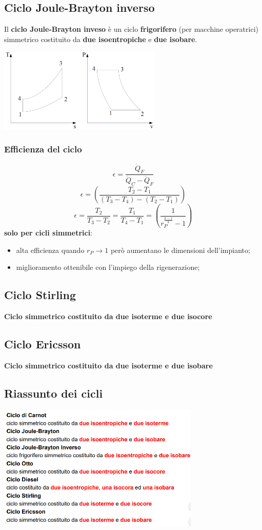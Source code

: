 \subsection{Ciclo Joule-Brayton inverso}
Il \textbf{ciclo Joule-Brayton inveso} è un ciclo \textbf{frigorifero} (per macchine operatrici) simmetrico costituito da \textbf{due isoentropiche} e \textbf{due isobare}.
\begin{center}
    \includegraphics[height=4cm]{../L07/img14.PNG}
\end{center}
\subsubsection{Efficienza del ciclo}
\[
    \epsilon = \frac{\dot{Q}_F}{\dot{Q}_C -\dot{Q}_F}
\]
\[
    \epsilon = \left(\frac{T_2-T_1}{(T_3-T_4) - (T_2-T_1)}\right)
\]
\[
    \epsilon = \frac{T_2}{T_3-T_2} = \frac{T_1}{T_4-T_1} = \left(  \frac{1}{r_P^{\frac{k-1}{k}}-1}  \right)
\]
\textbf{solo per cicli simmetrici}:
\begin{itemize}
    \item alta efficienza quando $r_P \rightarrow 1$ però aumentano le dimensioni dell'impianto;
    \item miglioramento ottenibile con l'impiego della rigenerazione;
\end{itemize}
\subsection{Ciclo Stirling}
\textbf{Ciclo simmetrico costituito da due isoterme e due isocore}
\subsection{Ciclo Ericsson}
\textbf{Ciclo simmetrico costituito da due isoterme e due isobare}
\subsection{Riassunto dei cicli}
\begin{center}
    \includegraphics[height=6cm]{../L07/img15.PNG}
\end{center}
